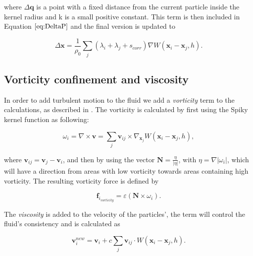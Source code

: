 where $\Delta \mathbf{q}$ is a point with a fixed distance from the current particle inside the kernel
radius and k is a small positive constant. This term is then included in
Equation $\ref{eq:DeltaP}$ and the final version is updated to

\begin{equation}
\label{eq:DeltaPscorr}
\Delta \mathbf{x} = \frac{1}{\rho_0} \sum\limits_{j} (\lambda_i + \lambda_j + s_{corr}) \nabla W(\mathbf{x}_i - \mathbf{x}_j, h).
\end{equation}

\subsection{Vorticity confinement and viscosity} 
In order to add turbulent motion to the fluid we add a \textit{vorticity} term to the calculations, as described in
\cite{macklin2013position}. The vorticity is calculated by first using the
Spiky kernel function as following:

\begin{equation}
\label{eq:Omega}
\omega_{i} = \nabla \times \mathbf{v} =  \sum\limits_{j} \mathbf{v}_{ij} \times \nabla_{\mathbf{x}_{j}} W(\mathbf{x}_{i} - \mathbf{x}_{j}, h),
\end{equation}

where $\mathbf{v}_{ij} = \mathbf{v}_{j} - \mathbf{v}_{i}$, and then by using the
vector $\mathbf{N} = \frac{\eta}{|\eta|}$, with $\eta = \nabla|\omega_{i}|$,
which will have a direction from areas with low vorticity towards areas
containing high vorticity. The resulting vorticity force is defined by

\begin{equation}
\label{eq:Vorticity}
\mathbf{f}_{i_{vorticity}} = \varepsilon \left(\mathbf{N} \times \omega_{i} \right).
\end{equation}

The \textit{viscosity} is added to the velocity of the particles', the term
will control the fluid's consistency and is calculated as

\begin{equation}
\label{eq:Viscosity}
\mathbf{v}_{i}^{new} = \mathbf{v}_{i} + c \sum\limits_{j} \mathbf{v}_{ij} \cdot W(\mathbf{x}_i - \mathbf{x}_j, h).
\end{equation}

